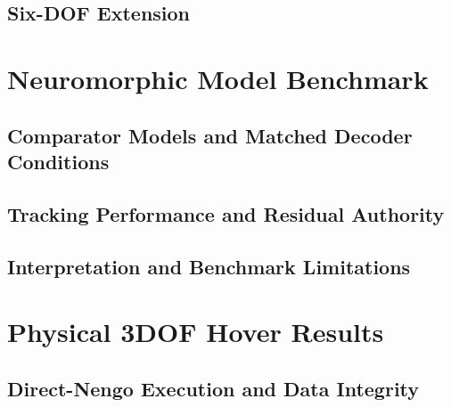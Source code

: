\documentclass[letterpaper,10pt,conference]{ieeeconf}
\begin{document}

\subsection{Six-DOF Extension}


\section{Neuromorphic Model Benchmark}
\label{sec:neuron_benchmark}

\subsection{Comparator Models and Matched Decoder Conditions}


\subsection{Tracking Performance and Residual Authority}


\subsection{Interpretation and Benchmark Limitations}


\section{Physical 3DOF Hover Results}
\label{sec:hover_results}

\subsection{Direct-Nengo Execution and Data Integrity}
\end{document}
